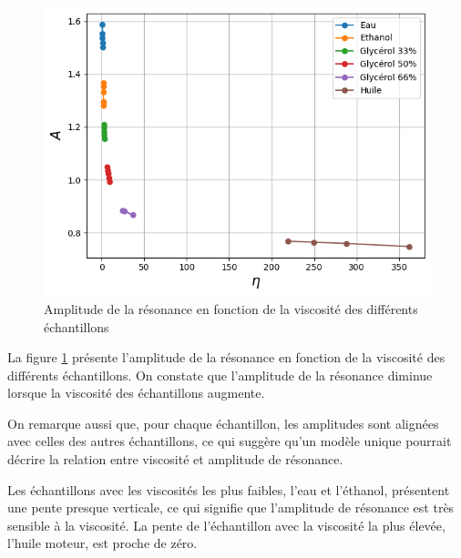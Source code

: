 \begin{figure}[H]
    \centering
    \includegraphics[width=\textwidth]{assets/figures/Amplitude-viscosite.png}
    \caption{Amplitude de la résonance en fonction de la viscosité des différents échantillons}
    \label{fig:Amplitude VS Viscosité}
\end{figure}

La figure \ref{fig:Amplitude VS Viscosité} présente l'amplitude de la résonance en fonction de la viscosité des différents échantillons.  
On constate que l'amplitude de la résonance diminue lorsque la viscosité des échantillons augmente.

On remarque aussi que, pour chaque échantillon, les amplitudes sont alignées avec celles des autres échantillons, ce qui suggère qu’un modèle unique pourrait décrire la relation entre viscosité et amplitude de résonance.

Les échantillons avec les viscosités les plus faibles, l'eau et l'éthanol, présentent une pente presque verticale, ce qui signifie que l'amplitude de résonance est très sensible à la viscosité.  
La pente de l'échantillon avec la viscosité la plus élevée, l'huile moteur, est proche de zéro.

